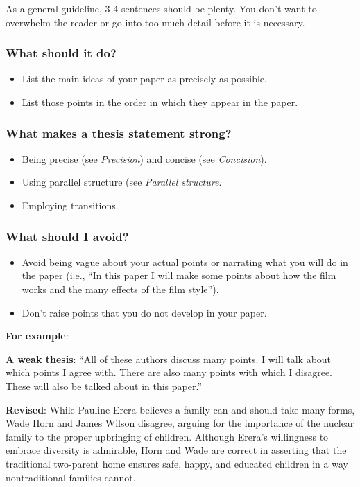 As a general guideline, 3-4 sentences should be plenty. You don't want to overwhelm the reader or go into too much detail before it is necessary.

\subsubsection{What should it do?}

\begin{itemize}
\item List the main ideas of your paper as precisely as possible.

\item List those points in the order in which they appear in the paper.

\end{itemize}

\subsubsection{What makes a thesis statement strong?}

\begin{itemize}
\item Being precise (see \emph{Precision}) and concise (see \emph{Concision}).

\item Using parallel structure (see \emph{Parallel structure}.

\item Employing transitions.
\end{itemize}

\subsubsection{What should I avoid?}

\begin{itemize}
\item Avoid being vague about your actual points or narrating what you will do in the paper (i.e., ``In this paper I will make some points about how the film works and the many effects of the film style'').

\item Don't raise points that you do not develop in your paper.

\end{itemize}

\textbf{For example}:

\textbf{A weak thesis}:  “All of these authors discuss many points. I will talk about which points I agree with. There are also many points with which I disagree. These will also be talked about in this paper.”


\textbf{Revised}: While Pauline Erera believes a family can and should take many forms, Wade Horn and James Wilson disagree, arguing for the importance of the nuclear family to the proper upbringing of children. Although Erera's willingness to embrace diversity is admirable, Horn and Wade are correct in asserting that the traditional two-parent home ensures safe, happy, and educated children in a way nontraditional families cannot.